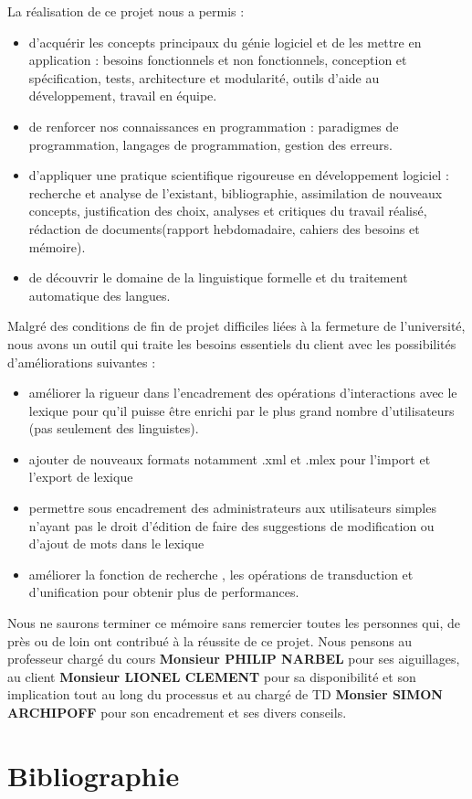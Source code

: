 \documentclass[a4paper, 12pt]{article}
\begin{document}
{La réalisation de ce projet nous a permis :
\begin{itemize}
    \item d'acquérir les concepts principaux du génie logiciel et de les mettre en application : besoins fonctionnels et non fonctionnels, conception et spécification, tests, architecture et modularité, outils d'aide au développement, travail en équipe.
    \item de renforcer nos connaissances en programmation : paradigmes de programmation, langages de programmation, gestion des erreurs.
    \item d'appliquer une pratique scientifique rigoureuse en développement logiciel : recherche et analyse de l'existant, bibliographie, assimilation de nouveaux concepts, justification des choix, analyses et critiques du travail réalisé, rédaction de documents(rapport hebdomadaire, cahiers des besoins et mémoire).
    \item de découvrir le domaine de la linguistique formelle et du traitement automatique des langues. 
    \end{itemize}{}\par}
{Malgré des conditions de fin de projet difficiles liées à la fermeture de l'université, nous avons un outil qui traite les besoins essentiels du client avec les possibilités d'améliorations suivantes :
    \begin{itemize}
        \item améliorer la rigueur dans l'encadrement des opérations d'interactions avec le lexique pour qu'il puisse être enrichi par le plus grand nombre d'utilisateurs (pas seulement des linguistes). 
        \item ajouter de nouveaux formats notamment .xml et .mlex pour l'import et l'export de lexique
        \item permettre sous encadrement des administrateurs aux utilisateurs simples n'ayant pas le droit d'édition  de faire des suggestions de modification ou d'ajout de mots dans le lexique 
        \item améliorer la fonction de recherche , les opérations de transduction et d'unification pour obtenir plus de performances.
    \end{itemize}{}\par}
    
    Nous ne saurons terminer ce mémoire sans remercier toutes les personnes qui, de près ou de loin ont contribué à la réussite de ce projet. Nous pensons au professeur chargé du cours \textbf{Monsieur PHILIP NARBEL} pour ses aiguillages, au client \textbf{Monsieur LIONEL CLEMENT} pour sa disponibilité et son implication tout au long du processus et au chargé de TD \textbf{Monsier SIMON ARCHIPOFF} pour son encadrement et ses divers conseils.
\newpage
\section{Bibliographie}
\nocite{*}
\printbibliography
\end{document}

